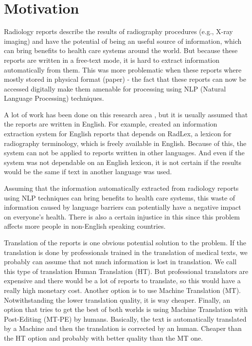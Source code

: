 \label{chap1}

\section{Motivation}
\label{motivation}

Radiology reports describe the results of radiography procedures (e.g., X-ray imaging) and have the potential of being an useful source of information, which can bring benefits to health care systems around the world. But because these reports are written in a free-text mode, it is hard to extract information automatically from them. This was more problematic when these reports where mostly stored in physical format (paper) - the fact that these reports can now be accessed digitally make them amenable for processing using NLP (Natural Language Processing) techniques. 

A lot of work has been done on this research area \citep{Pons2016}, but it is usually assumed that the reports are written in English. For example, \citep{Hassanpour2016} created an information extraction system for English reports that depends on RadLex, a lexicon for radiography terminology, which is freely available in English. Because of this, the system can not be applied to reports written in other languages. And even if the system was not dependable on an English lexicon, it is not certain if the results would be the same if text in another language was used.

Assuming that the information automatically extracted from radiology reports using NLP techniques can bring benefits to health care systems, this waste of information caused by language barriers can potentially have a negative impact on everyone's health. There is also a certain injustice in this since this problem affects more people in non-English speaking countries. 

Translation of the reports is one obvious potential solution to the problem. If the translation is done by professionals trained in the translation of medical texts, we probably can assume that not much information is lost in translation. We call this type of translation Human Translation (HT). But professional translators are expensive and there would be a lot of reports to translate, so this would have a really high monetary cost. Another option is to use Machine Translation (MT). Notwithstanding the lower translation quality, it is way cheaper. Finally, an option that tries to get the best of both worlds is using Machine Translation with Post-Editing (MT-PE) by humans. Basically, the text is automatically translated by a Machine and then the translation is corrected by an human. Cheaper than the HT option and probably with better quality than the MT one. 

